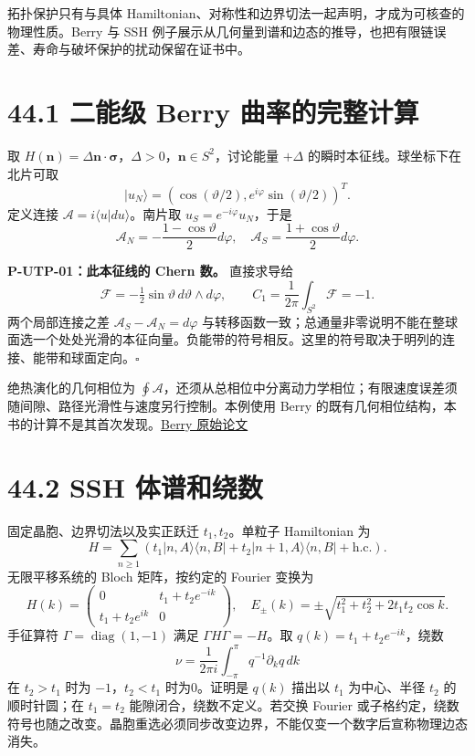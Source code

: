 \documentclass[
  11pt,
  oneside]{book}
\begin{document}
拓扑保护只有与具体
Hamiltonian、对称性和边界切法一起声明，才成为可核查的物理性质。Berry 与
SSH
例子展示从几何量到谱和边态的推导，也把有限链误差、寿命与破坏保护的扰动保留在证书中。

\section{44.1 二能级 Berry 曲率的完整计算}

取
\(H(\mathbf n)=\Delta\mathbf n\cdot\boldsymbol\sigma\)，\(\Delta>0\)，\(\mathbf n\in S^2\)，讨论能量
\(+\Delta\) 的瞬时本征线。球坐标下在北片可取 \[
|u_N\rangle=(\cos(\vartheta/2),e^{i\varphi}\sin(\vartheta/2))^T.
\] 定义连接 \(\mathcal A=i\langle u|du\rangle\)。南片取
\(u_S=e^{-i\varphi}u_N\)，于是 \[
\mathcal A_N=-\frac{1-\cos\vartheta}{2}d\varphi,
\quad \mathcal A_S=\frac{1+\cos\vartheta}{2}d\varphi.
\]

\protect\hypertarget{p-utp-01}{}{}

\textbf{P-UTP-01：此本征线的 Chern 数。} 直接求导给 \[
\mathcal F=-\tfrac12\sin\vartheta\,d\vartheta\wedge d\varphi,
\qquad C_1=\frac1{2\pi}\int_{S^2}\mathcal F=-1.
\] 两个局部连接之差 \(\mathcal A_S-\mathcal A_N=d\varphi\)
与转移函数一致；总通量非零说明不能在整球面选一个处处光滑的本征向量。负能带的符号相反。这里的符号取决于明列的连接、能带和球面定向。\(\square\)

绝热演化的几何相位为
\(\oint\mathcal A\)，还须从总相位中分离动力学相位；有限速度误差须随间隙、路径光滑性与速度另行控制。本例使用
Berry
的既有几何相位结构，本书的计算不是其首次发现。\href{https://doi.org/10.1098/rspa.1984.0023}{Berry
原始论文}

\section{44.2 SSH 体谱和绕数}

固定晶胞、边界切法以及实正跃迁 \(t_1,t_2\)。单粒子 Hamiltonian 为 \[
H=\sum_{n\ge1}(t_1|n,A\rangle\langle n,B|
+t_2|n+1,A\rangle\langle n,B|+\mathrm{h.c.}).
\] 无限平移系统的 Bloch 矩阵，按约定的 Fourier 变换为 \[
H(k)=\begin{pmatrix}0&t_1+t_2e^{-ik}\\t_1+t_2e^{ik}&0\end{pmatrix},
\quad E_\pm(k)=\pm\sqrt{t_1^2+t_2^2+2t_1t_2\cos k}.
\] 手征算符 \(\Gamma=\operatorname{diag}(1,-1)\) 满足
\(\Gamma H\Gamma=-H\)。取 \(q(k)=t_1+t_2e^{-ik}\)，绕数 \[
\nu=\frac{1}{2\pi i}\int_{-\pi}^{\pi}q^{-1}\partial_kq\,dk
\] 在 \(t_2>t_1\) 时为 \(-1\)，\(t_2<t_1\) 时为0。证明是 \(q(k)\) 描出以
\(t_1\) 为中心、半径 \(t_2\) 的顺时针圆；在 \(t_1=t_2\)
能隙闭合，绕数不定义。若交换 Fourier
或子格约定，绕数符号也随之改变。晶胞重选必须同步改变边界，不能仅变一个数字后宣称物理边态消失。
\end{document}
